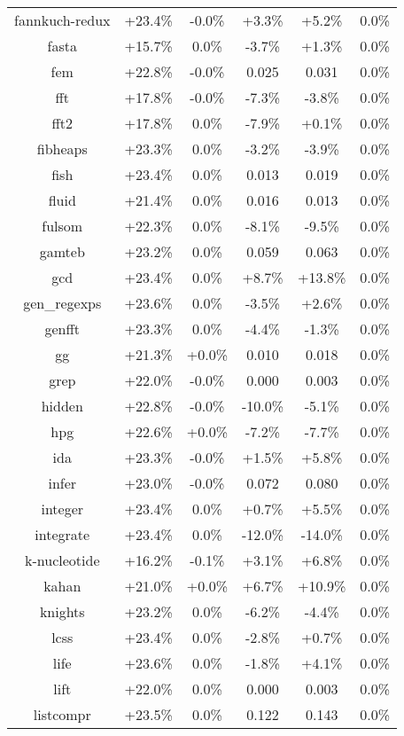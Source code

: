 \begin{tabular}{ c c c c c c }
fannkuch-redux & +23.4\% & -0.0\% & +3.3\% & +5.2\% &  0.0\%\\
fasta & +15.7\% &  0.0\% & -3.7\% & +1.3\% &  0.0\%\\
fem & +22.8\% & -0.0\% & 0.025 & 0.031 &  0.0\%\\
fft & +17.8\% & -0.0\% & -7.3\% & -3.8\% &  0.0\%\\
fft2 & +17.8\% &  0.0\% & -7.9\% & +0.1\% &  0.0\%\\
fibheaps & +23.3\% &  0.0\% & -3.2\% & -3.9\% &  0.0\%\\
fish & +23.4\% &  0.0\% & 0.013 & 0.019 &  0.0\%\\
fluid & +21.4\% &  0.0\% & 0.016 & 0.013 &  0.0\%\\
fulsom & +22.3\% &  0.0\% & -8.1\% & -9.5\% &  0.0\%\\
gamteb & +23.2\% &  0.0\% & 0.059 & 0.063 &  0.0\%\\
gcd & +23.4\% &  0.0\% & +8.7\% & +13.8\% &  0.0\%\\
gen\_regexps & +23.6\% &  0.0\% & -3.5\% & +2.6\% &  0.0\%\\
genfft & +23.3\% &  0.0\% & -4.4\% & -1.3\% &  0.0\%\\
gg & +21.3\% & +0.0\% & 0.010 & 0.018 &  0.0\%\\
grep & +22.0\% & -0.0\% & 0.000 & 0.003 &  0.0\%\\
hidden & +22.8\% & -0.0\% & -10.0\% & -5.1\% &  0.0\%\\
hpg & +22.6\% & +0.0\% & -7.2\% & -7.7\% &  0.0\%\\
ida & +23.3\% & -0.0\% & +1.5\% & +5.8\% &  0.0\%\\
infer & +23.0\% & -0.0\% & 0.072 & 0.080 &  0.0\%\\
integer & +23.4\% &  0.0\% & +0.7\% & +5.5\% &  0.0\%\\
integrate & +23.4\% &  0.0\% & -12.0\% & -14.0\% &  0.0\%\\
k-nucleotide & +16.2\% & -0.1\% & +3.1\% & +6.8\% &  0.0\%\\
kahan & +21.0\% & +0.0\% & +6.7\% & +10.9\% &  0.0\%\\
knights & +23.2\% &  0.0\% & -6.2\% & -4.4\% &  0.0\%\\
lcss & +23.4\% &  0.0\% & -2.8\% & +0.7\% &  0.0\%\\
life & +23.6\% &  0.0\% & -1.8\% & +4.1\% &  0.0\%\\
lift & +22.0\% &  0.0\% & 0.000 & 0.003 &  0.0\%\\
listcompr & +23.5\% &  0.0\% & 0.122 & 0.143 &  0.0\%\\

\end{tabular}
